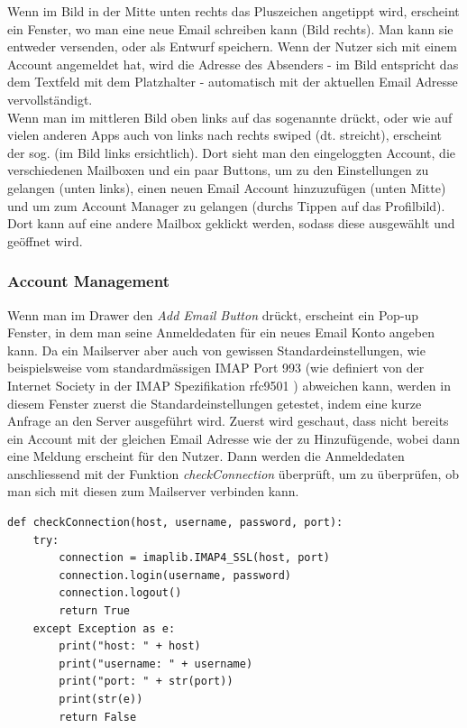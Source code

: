 \documentclass[a4paper,11pt]{article}
\begin{document}
Wenn im Bild in der Mitte unten rechts das Pluszeichen angetippt wird, erscheint ein Fenster, wo man eine neue Email schreiben kann (Bild rechts). Man kann sie entweder versenden, oder als Entwurf speichern. Wenn der Nutzer sich mit einem Account angemeldet hat, wird die Adresse des Absenders - im Bild entspricht das dem Textfeld mit dem Platzhalter  - automatisch mit der aktuellen Email Adresse vervollständigt.\\

Wenn man im mittleren Bild oben links auf das sogenannte  drückt, oder wie auf vielen anderen Apps auch von links nach rechts swiped (dt. streicht), erscheint der sog.  (im Bild links ersichtlich). Dort sieht man den eingeloggten Account, die verschiedenen Mailboxen und ein paar Buttons, um zu den Einstellungen zu gelangen (unten links), einen neuen Email Account hinzuzufügen (unten Mitte) und um zum Account Manager zu gelangen (durchs Tippen auf das Profilbild). Dort kann auf eine andere Mailbox geklickt werden, sodass diese ausgewählt und geöffnet wird.


\newpage

\subsubsection{Account Management}

Wenn man im Drawer den \textit{Add Email Button} drückt, erscheint ein Pop-up Fenster, in dem man seine Anmeldedaten für ein neues Email Konto angeben kann. Da ein Mailserver aber auch von gewissen Standardeinstellungen, wie beispielsweise vom standardmässigen IMAP Port 993 (wie definiert von der Internet Society in der IMAP Spezifikation rfc9501 \cite{rfc9501}) abweichen kann, werden in diesem Fenster zuerst die Standardeinstellungen getestet, indem eine kurze Anfrage an den Server ausgeführt wird. Zuerst wird geschaut, dass nicht bereits ein Account mit der gleichen Email Adresse wie der zu Hinzufügende, wobei dann eine Meldung erscheint für den Nutzer. Dann werden die Anmeldedaten anschliessend mit der Funktion \textit{checkConnection} überprüft, um zu überprüfen, ob man sich mit diesen zum Mailserver verbinden kann.\\

\lstset{language=python}
\begin{lstlisting}
def checkConnection(host, username, password, port):
    try:
        connection = imaplib.IMAP4_SSL(host, port)
        connection.login(username, password)
        connection.logout()
        return True
    except Exception as e:
        print("host: " + host)
        print("username: " + username)
        print("port: " + str(port))
        print(str(e))
        return False

\end{lstlisting}
\end{document}
